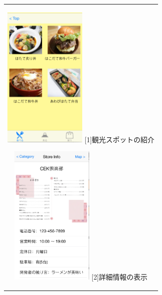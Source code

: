 \begin{figure}[htbp]
  \begin{center}
    \begin{tabular}{c}

      \begin{minipage}{0.33\hsize}
        \begin{center}
\includegraphics[width=4cm, bb=0 0 320 552]{5.4_category.png}
          \hspace{1cm} [1]観光スポットの紹介
        \end{center}
      \end{minipage}

      \begin{minipage}{0.33\hsize}
        \begin{center}
\includegraphics[width=4cm, bb=0 0 321 547]{5.4_detail.png}
          \hspace{1cm} [2]詳細情報の表示
        \end{center}
      \end{minipage}


\end{tabular}
\end{center}
\end{figure}
